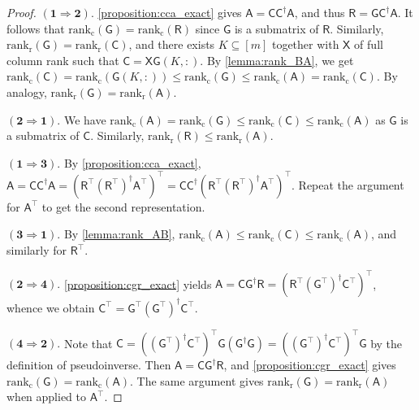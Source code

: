 \documentclass[onefignum,onetabnum]{siamart250211}
\newcommand{\Batrix}[1]{\bm{\Matrix{#1}}}
\newcommand{\Matrix}[1]{\mathsf{#1}}
\newcommand{\trans}{\intercal}
\newcommand{\pinv}{\dagger}
\newcommand{\Rank}[3][]{\mathrm{rank_{#2}} #1( #3 #1)}
\newcommand{\Index}[1]{{#1}}
\begin{document}
\begin{proof}
$\mathbf{(1 \Rightarrow 2).}$
\cref{proposition:cca_exact} gives $\Batrix{A} = \Batrix{C} \Batrix{C}^\pinv \Batrix{A}$, and thus $\Batrix{R} = \Batrix{G} \Batrix{C}^\pinv \Batrix{A}$.
It follows that $\Rank{c}{\Batrix{G}} = \Rank{c}{\Batrix{R}}$ since $\Batrix{G}$ is a submatrix of $\Batrix{R}$.
Similarly, $\Rank{r}{\Batrix{G}} = \Rank{r}{\Batrix{C}}$, and there exists $\Index{K} \subseteq [m]$ together with $\Matrix{X}$ of full column rank such that $\Batrix{C} = \Matrix{X} \Batrix{G}(\Index{K}, :)$.
By \cref{lemma:rank_BA}, we get $\Rank{c}{\Batrix{C}} = \Rank{c}{\Batrix{G}(\Index{K}, :)} \leq \Rank{c}{\Batrix{G}} \leq \Rank{c}{\Batrix{A}} = \Rank{c}{\Batrix{C}}$.
By analogy, $\Rank{r}{\Batrix{G}} = \Rank{r}{\Batrix{A}}$.

$\mathbf{(2 \Rightarrow 1).}$
We have $\Rank{c}{\Batrix{A}} = \Rank{c}{\Batrix{G}} \leq \Rank{c}{\Batrix{C}} \leq \Rank{c}{\Batrix{A}}$ as $\Batrix{G}$ is a submatrix of $\Batrix{C}$.
Similarly, $\Rank{r}{\Batrix{R}} \leq \Rank{r}{\Batrix{A}}$.

$\mathbf{(1 \Rightarrow 3).}$
By \cref{proposition:cca_exact}, $\Batrix{A} = \Batrix{C} \Batrix{C}^\pinv \Batrix{A} = (\Batrix{R}^\trans (\Batrix{R}^\trans)^\pinv \Batrix{A}^\trans)^\trans = \Batrix{C} \Batrix{C}^\pinv (\Batrix{R}^\trans (\Batrix{R}^\trans)^\pinv \Batrix{A}^\trans)^\trans$.
Repeat the argument for $\Batrix{A}^\trans$ to get the second representation.

$\mathbf{(3 \Rightarrow 1).}$
By \cref{lemma:rank_AB}, $\Rank{c}{\Batrix{A}} \leq \Rank{c}{\Batrix{C}} \leq \Rank{c}{\Batrix{A}}$, and similarly for $\Batrix{R}^\trans$. 

$\mathbf{(2 \Rightarrow 4).}$
\cref{proposition:cgr_exact} yields $\Batrix{A} = \Batrix{C} \Batrix{G}^\pinv \Batrix{R} = (\Batrix{R}^\trans (\Batrix{G}^\trans)^\pinv \Batrix{C}^\trans)^\trans$, whence we obtain $\Batrix{C}^\trans = \Batrix{G}^\trans (\Batrix{G}^\trans)^\pinv \Batrix{C}^\trans$.

$\mathbf{(4 \Rightarrow 2).}$
Note that $\Batrix{C} = ((\Batrix{G}^\trans)^\pinv \Batrix{C}^\trans)^\trans \Batrix{G} (\Batrix{G}^\pinv \Batrix{G}) = ((\Batrix{G}^\trans)^\pinv \Batrix{C}^\trans)^\trans \Batrix{G}$ by the definition of pseudoinverse.
Then $\Batrix{A} = \Batrix{C} \Batrix{G}^\pinv \Batrix{R}$, and \cref{proposition:cgr_exact} gives $\Rank{c}{\Batrix{G}} = \Rank{c}{\Batrix{A}}$.
The same argument gives $\Rank{r}{\Batrix{G}} = \Rank{r}{\Batrix{A}}$ when applied to $\Batrix{A}^\trans$.
\end{proof}
\end{document}
